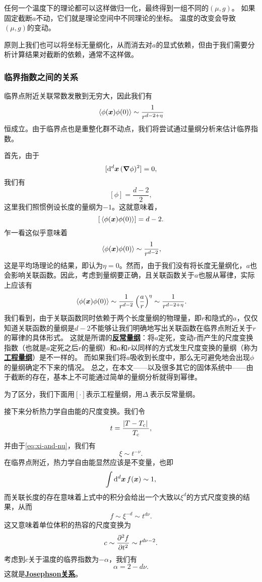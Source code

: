\documentclass[hyperref, UTF8, a4paper]{ctexart}
\newcommand*{\concept}[1]{\underline{\textbf{#1}}}
\begin{document}
任何一个温度下的理论都可以这样做归一化，最终得到一组不同的$(\mu, g)$。
如果固定截断$a$不动，它们就是理论空间中不同理论的坐标。
温度的改变会导致$(\mu, g)$的变动。

原则上我们也可以将坐标无量纲化，从而消去对$a$的显式依赖，但由于我们需要分析计算结果对截断的依赖，通常不这样做。

\subsubsection{临界指数之间的关系}

临界点附近关联常数发散到无穷大，因此我们有
\[
    \expval*{\phi(\vb*{x}) \phi(0)} \sim \frac{1}{r^{d-2+\eta}}
\]
恒成立。由于临界点也是重整化群不动点，我们将尝试通过量纲分析来估计临界指数。

首先，由于
\[
    [\dd[d]{\vb*{x}} (\grad{\phi})^2] = 0,
\]
我们有
\[
    [\phi] = \frac{d-2}{2},
\]
这里我们照惯例设长度的量纲为$-1$。这就意味着，
\[
    [\expval*{\phi(\vb*{x}) \phi(0)}] = d-2.
\]
乍一看这似乎意味着
\[
    \expval*{\phi(\vb*{x}) \phi(0)} \sim \frac{1}{r^{d-2}},
\]
这是平均场理论的结果，即认为$\eta=0$。然而，由于我们没有将长度无量纲化，$a$也会影响关联函数。因此，考虑到量纲要正确，且关联函数关于$a$也服从幂律，实际上应该有
\begin{equation}
    \expval*{\phi(\vb*{x}) \phi(0)} \sim \frac{1}{r^{d-2}} \left( \frac{a}{r} \right)^\eta \sim \frac{1}{r^{d-2+\eta}}.
    \label{eq:correlation-scaling}
\end{equation}
我们看到，由于关联函数同时依赖于两个长度量纲的物理量，即$r$和隐式的$a$，仅仅知道关联函数的量纲是$d-2$不能够让我们明确地写出关联函数在临界点附近关于$r$的幂律的具体形式。
这就是所谓的\concept{反常量纲}：将$a$定死，变动$r$而产生的尺度变换指数（也就是$a$定死之后$r$的量纲）和$a$和$r$以同样的方式发生尺度变换的量纲（称为\concept{工程量纲}）是不一样的。
而如果我们将$a$吸收到长度中，那么无可避免地会出现$\phi$的量纲确定不下来的情况。
总之，在本文——以及很多其它的固体系统中——由于截断的存在，基本上不可能通过简单的量纲分析就得到幂律。

为了区分，我们下面用$[\cdot]$表示工程量纲，用$\Delta_{\cdot}$表示反常量纲。

接下来分析热力学自由能的尺度变换。我们令
\begin{equation}
    t = \frac{\abs*{T-T_\text{c}}}{T_\text{c}},
\end{equation}
并由于\eqref{eq:xi-and-nu}，我们有
\begin{equation}
    \xi \sim t^{-\nu}.
\end{equation}
在临界点附近，热力学自由能显然应该是不变量，也即
\[
    \int \dd[d]{\vb*{x}} f(\vb*{x}) \sim 1,
\]
而关联长度的存在意味着上式中的积分会给出一个大致以$\xi^d$的方式尺度变换的结果，从而
\begin{equation}
    f \sim \xi^{-d} \sim t^{d\nu}.
\end{equation}
这又意味着单位体积的热容的尺度变换为
\[
    c \sim \pdv[2]{f}{t} \sim t^{d\nu-2}.
\]
考虑到$c$关于温度的临界指数为$-\alpha$，我们有
\begin{equation}
    \alpha = 2 - d \nu.
    \label{eq:josephson-relation}
\end{equation}
这就是\concept{Josephson关系}。
\end{document}
